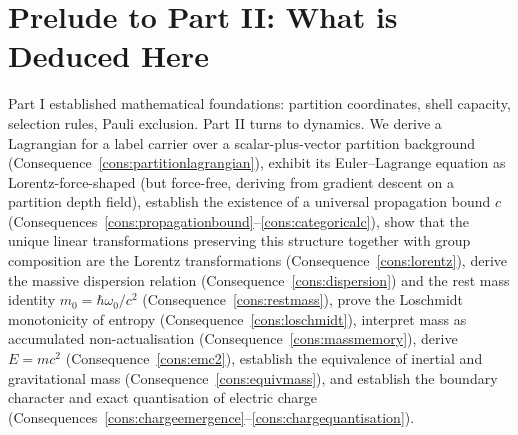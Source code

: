 

\section*{Prelude to Part II: What is Deduced Here}

Part I established mathematical foundations: partition coordinates, shell capacity, selection rules, Pauli exclusion. Part II turns to dynamics. We derive a Lagrangian for a label carrier over a scalar-plus-vector partition background (Consequence~\ref{cons:partitionlagrangian}), exhibit its Euler--Lagrange equation as Lorentz-force-shaped (but force-free, deriving from gradient descent on a partition depth field), establish the existence of a universal propagation bound $c$ (Consequences~\ref{cons:propagationbound}--\ref{cons:categoricalc}), show that the unique linear transformations preserving this structure together with group composition are the Lorentz transformations (Consequence~\ref{cons:lorentz}), derive the massive dispersion relation (Consequence~\ref{cons:dispersion}) and the rest mass identity $m_{0}=\hbar\omega_{0}/c^{2}$ (Consequence~\ref{cons:restmass}), prove the Loschmidt monotonicity of entropy (Consequence~\ref{cons:loschmidt}), interpret mass as accumulated non-actualisation (Consequence~\ref{cons:massmemory}), derive $E=mc^{2}$ (Consequence~\ref{cons:emc2}), establish the equivalence of inertial and gravitational mass (Consequence~\ref{cons:equivmass}), and establish the boundary character and exact quantisation of electric charge (Consequences~\ref{cons:chargeemergence}--\ref{cons:chargequantisation}).


